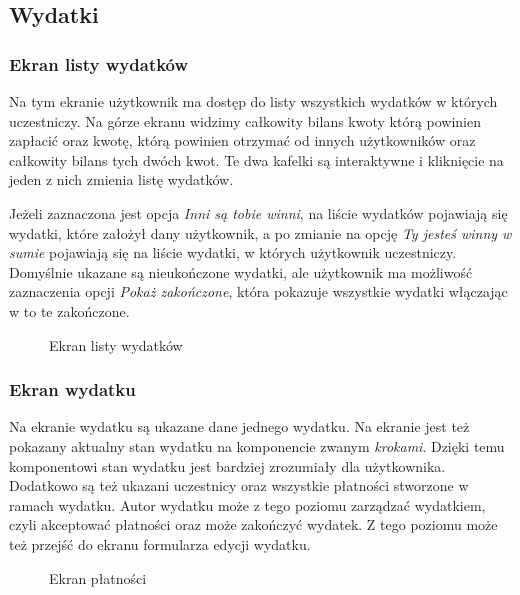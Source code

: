 \newpage
\subsection{Wydatki}
\subsubsection{Ekran listy wydatków}
Na tym ekranie użytkownik ma dostęp do listy wszystkich wydatków w których uczestniczy. Na górze ekranu widzimy całkowity bilans kwoty którą powinien zapłacić oraz kwotę, którą powinien otrzymać od innych użytkowników oraz całkowity bilans tych dwóch kwot. Te dwa kafelki są interaktywne i kliknięcie na jeden z nich zmienia listę wydatków.

Jeżeli zaznaczona jest opcja \emph{Inni są tobie winni}, na liście wydatków pojawiają się wydatki, które założył dany użytkownik, a po zmianie na opcję \emph{Ty jesteś winny w sumie} pojawiają się na liście wydatki, w których użytkownik uczestniczy. Domyślnie ukazane są nieukończone wydatki, ale użytkownik ma możliwość zaznaczenia opcji \emph{Pokaż zakończone}, która pokazuje wszystkie wydatki włączając w to te zakończone.

\begin{figure}[h]%
    \centering
    \caption{Ekran listy wydatków}%
    \label{fig:example}%
\end{figure}

\newpage
\subsubsection{Ekran wydatku}
Na ekranie wydatku są ukazane dane jednego wydatku. Na ekranie jest też pokazany aktualny stan wydatku na komponencie zwanym \emph{krokami}. Dzięki temu komponentowi stan wydatku jest bardziej zrozumiały dla użytkownika. Dodatkowo są też ukazani uczestnicy oraz wszystkie płatności stworzone w ramach wydatku. Autor wydatku może z tego poziomu zarządzać wydatkiem, czyli akceptować płatności oraz może zakończyć wydatek. Z tego poziomu może też przejść do ekranu formularza edycji wydatku.

\begin{figure}[h!]%
    \centering
    \qquad
    \qquad
    \qquad
    \caption{Ekran płatności}%
    \label{fig:example}%
\end{figure}

